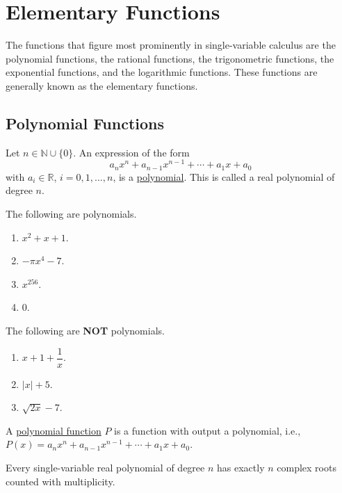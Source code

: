 \documentclass[11pt]{book}
\theoremstyle{break}
\theoremstyle{no_label}
\newcommand{\bbR}{\mathbb{R}}
\newcommand{\bbN}{\mathbb{N}}
\numberwithin{equation}{section}
\begin{document}
\section{Elementary Functions}

The functions that figure most prominently in single-variable calculus are the polynomial functions, the rational functions, the trigonometric functions, the exponential functions, and the logarithmic functions. These functions are generally known as the elementary functions.

\subsection*{Polynomial Functions}

\begin{definition}[Polynomial]
    Let $n\in\bbN\cup\{0\}$. An expression of the form $$a_nx^n+a_{n-1}x^{n-1}+\cdots+a_1x+a_0$$ with $a_i\in\bbR$, $i=0, 1, \dots, n$, is a \underline{polynomial}. This is called a real polynomial of degree $n$.
\end{definition}

\begin{example}
    The following are polynomials.
    \begin{enumerate}
        \item $x^2+x+1$.
        \item $-\pi x^4-7$.
        \item $x^{256}$.
        \item $0$.
    \end{enumerate}
\end{example}

\begin{example}
    The following are \textbf{NOT} polynomials.
    \begin{enumerate}
        \item $x+1+\dfrac{1}{x}$.
        \item $|x|+5$.
        \item $\sqrt{2x}-7$.
    \end{enumerate}
\end{example}

\begin{definition}
    A \underline{polynomial function} $P$ is a function with output a polynomial, i.e., $P(x)=a_nx^n+a_{n-1}x^{n-1}+\cdots+a_1x+a_0$.
\end{definition}

\begin{theorem}
    Every single-variable real polynomial of degree $n$ has exactly $n$ complex roots counted with multiplicity.
\end{theorem}
\end{document}
